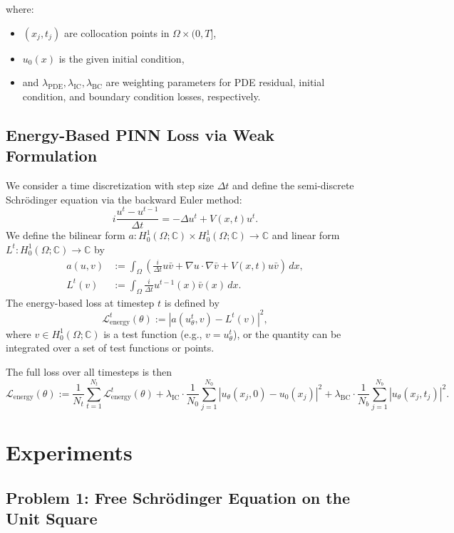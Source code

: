 \documentclass{article}
\theoremstyle{definition}
\theoremstyle{plain}
\theoremstyle{remark}
\begin{document}
where:
\begin{itemize}
  \item $(x_j, t_j)$ are collocation points in $\Omega \times (0,T]$,
  \item $u_0(x)$ is the given initial condition,
  \item and $\lambda_{\mathrm{PDE}}, \lambda_{\mathrm{IC}}, \lambda_{\mathrm{BC}}$ are weighting parameters for PDE residual, initial condition, and boundary condition losses, respectively.
\end{itemize}

\subsection*{Energy-Based PINN Loss via Weak Formulation}

We consider a time discretization with step size $\Delta t$ and define the semi-discrete Schrödinger equation via the backward Euler method:
\[
i \frac{u^t - u^{t-1}}{\Delta t} = -\Delta u^t + V(x,t) u^t.
\]
We define the bilinear form $a : H_0^1(\Omega; \mathbb{C}) \times H_0^1(\Omega; \mathbb{C}) \to \mathbb{C}$ and linear form $L^t : H_0^1(\Omega; \mathbb{C}) \to \mathbb{C}$ by
\begin{align*}
a(u, v) &:= \int_\Omega \left( \frac{i}{\Delta t} u \bar{v} + \nabla u \cdot \nabla \bar{v} + V(x,t) u \bar{v} \right) \, dx, \\
L^t(v) &:= \int_\Omega \frac{i}{\Delta t} u^{t-1}(x) \bar{v}(x) \, dx.
\end{align*}
The energy-based loss at timestep $t$ is defined by
\[
\mathcal{L}_{\text{energy}}^t(\theta) := \left| a(u_\theta^t, v) - L^t(v) \right|^2,
\]
where $v \in H_0^1(\Omega; \mathbb{C})$ is a test function (e.g., $v = u_\theta^t$), or the quantity can be integrated over a set of test functions or points.

The full loss over all timesteps is then
\[
\mathcal{L}_{\text{energy}}(\theta) := \frac{1}{N_t} \sum_{t=1}^{N_t} \mathcal{L}_{\text{energy}}^t(\theta)
+ \lambda_{\mathrm{IC}} \cdot \frac{1}{N_0} \sum_{j=1}^{N_0} \left| u_\theta(x_j, 0) - u_0(x_j) \right|^2
+ \lambda_{\mathrm{BC}} \cdot \frac{1}{N_b} \sum_{j=1}^{N_b} \left| u_\theta(x_j, t_j) \right|^2.
\]

\section{Experiments}

\subsection*{Problem 1: Free Schrödinger Equation on the Unit Square}
\end{document}
